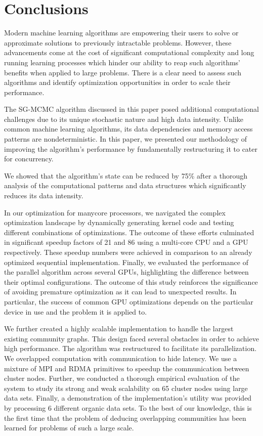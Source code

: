 \section{Conclusions}
\label{sec-conclusion}

Modern machine learning algorithms are empowering their
users to solve or approximate solutions to previously intractable problems.
However, these advancements come at the cost of significant computational
complexity and long running learning processes which hinder our ability to reap
such algorithms' benefits when applied to large problems. There is a clear need
to assess such algorithms and identify optimization opportunities in order to
scale their performance.

The SG-MCMC algorithm discussed in this paper posed additional computational
challenges due to its unique stochastic nature and high data intensity. Unlike
common machine learning algorithms, its data dependencies and memory access
patterns are nondeterministic. In this paper, we presented our methodology of
improving the algorithm's performance by fundamentally restructuring it to
cater for concurrency.

We showed that the algorithm's state can be reduced by 75\% after a thorough
analysis of the computational patterns and data structures which significantly
reduces its data intensity.

In our optimization for manycore processors, we navigated the complex optimization
landscape by dynamically generating kernel code and testing different
combinations of optimizations. The outcome of these efforts culminated in
significant speedup factors of 21 and 86 using a multi-core CPU and a GPU
respectively. These speedup numbers were achieved in comparison to an already
optimized sequential implementation. Finally, we evaluated the performance of
the parallel algorithm across several GPUs, highlighting the difference between
their optimal configurations.
%
The outcome of this study reinforces the significance of avoiding premature
optimization as it can lead to unexpected results. In particular, the success
of common GPU optimizations depends on the particular device in use and the
problem it is applied to.

We further created a highly scalable implementation to handle the largest existing
community graphs.
This design faced
several obstacles in order to achieve high performance.
The algorithm was restructured to facilitate its
parallelization. We overlapped computation
with communication to hide latency.  We use a
mixture of MPI and RDMA primitives to speedup the communication between cluster
nodes.
%
Further, we conducted a thorough empirical evaluation of the system to study its strong
and weak scalability on 65 cluster nodes using large data sets.
Finally, a
demonstration of the implementation's utility was provided by processing 6
different organic data sets.
To the best of
our knowledge, this is the first time that the problem of deducing overlapping
communities has been learned for problems of such a large scale.
